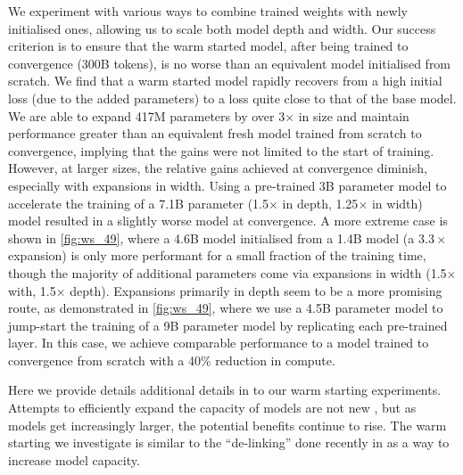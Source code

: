 \documentclass[11pt, a4paper, logo, internal, copyright, nonumbering]{deepmind}
\begin{document}
We experiment with various ways to combine trained weights with newly initialised ones, allowing us to scale both model depth and width.
Our success criterion is to ensure that the warm started model, after being trained to convergence (300B tokens), is no worse than an equivalent model initialised from scratch.
We find that a warm started model rapidly recovers from a high initial loss (due to the added parameters) to a loss quite close to that of the base model.
We are able to expand 417M parameters by over 3$\times$ in size and maintain performance greater than an equivalent fresh model trained from scratch to convergence, implying that the gains were not limited to the start of training.
However, at larger sizes, the relative gains achieved at convergence diminish, especially with expansions in width.
Using a pre-trained 3B parameter model to accelerate the training of a 7.1B parameter (1.5$
\times$ in depth, 1.25$\times$ in width) model resulted in a slightly worse model at convergence.
A more extreme case is shown in \autoref{fig:ws_49}, where a 4.6B model initialised from a 1.4B model (a $3.3\times$ expansion) is only more performant for a small fraction of the training time, though the majority of additional parameters come via expansions in width (1.5$\times$ with, 1.5$\times$ depth).  
Expansions primarily in depth seem to be a more promising route, as demonstrated in \autoref{fig:ws_49}, where we use a 4.5B parameter model to jump-start the training of a 9B parameter model by replicating each pre-trained layer. In this case, we achieve comparable performance to a model trained to convergence from scratch with a 40\% reduction in compute.

Here we provide details additional details in to our warm starting experiments. 
Attempts to efficiently expand the capacity of models are not new \citep{chen2015net2net}, but as models get increasingly larger, the potential benefits continue to rise.
The warm starting we investigate is similar to the ``de-linking'' done recently in \citet{lin2021m610t} as a way to increase model capacity.
\end{document}
